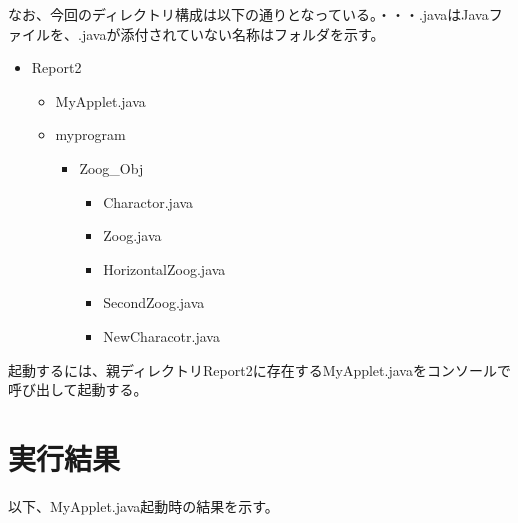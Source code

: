 \documentclass[dvipdfmx]{jsarticle}
\begin{document}
なお、今回のディレクトリ構成は以下の通りとなっている。・・・.javaはJavaファイルを、.javaが添付されていない名称はフォルダを示す。
\begin{itemize}
  \item Report2
  \begin{itemize}
    \item MyApplet.java
    \item myprogram
    \begin{itemize}
      \item Zoog\_Obj
      \begin{itemize}
        \item Charactor.java
        \item Zoog.java
        \item HorizontalZoog.java
        \item SecondZoog.java
        \item NewCharacotr.java
      \end{itemize}
    \end{itemize}
  \end{itemize}
\end{itemize}
起動するには、親ディレクトリReport2に存在するMyApplet.javaをコンソールで呼び出して起動する。
\section{実行結果}
以下、MyApplet.java起動時の結果を示す。
\end{document}
